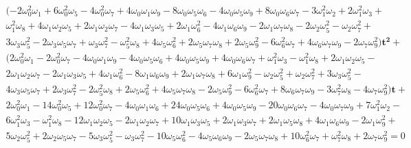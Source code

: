 \documentclass[a4paper,10pt]{amsart}
\theoremstyle{plain}
\theoremstyle{definition}
\theoremstyle{remark}
\numberwithin{equation}{section}
\begin{document}
\begin{gather*}
(-2\omega_{0}^2\omega_{1} + 6\omega_{0}^2\omega_{5} - 4\omega_{0}^2\omega_{7} + 4\omega_{0}\omega_{1}\omega_{9} - 8\omega_{0}\omega_{5}\omega_{6}
    - 4\omega_{0}\omega_{5}\omega_{9} + 8\omega_{0}\omega_{6}\omega_{7} - 3\omega_{1}^2\omega_{2} + 2\omega_{1}^2\omega_{3} +\\
    \omega_{1}^2\omega_{8} + 
4\omega_{1}\omega_{2}\omega_{5} + 2\omega_{1}\omega_{2}\omega_{7} - 4\omega_{1}\omega_{3}\omega_{5} +
    2\omega_{1}\omega_{6}^2 - 4\omega_{1}\omega_{6}\omega_{9} - 2\omega_{1}\omega_{7}\omega_{8} - 2\omega_{2}\omega_{5}^2 -
    \omega_{2}\omega_{7}^2 +\\ 3\omega_{3}\omega_{5}^2 - 2\omega_{3}\omega_{5}\omega_{7} + 
\omega_{3}\omega_{7}^2 - \omega_{5}^2\omega_{8} +
    4\omega_{5}\omega_{6}^2 + 2\omega_{5}\omega_{7}\omega_{8} + 2\omega_{5}\omega_{9}^2 - 6\omega_{6}^2\omega_{7} +
    4\omega_{6}\omega_{7}\omega_{9} - 2\omega_{7}\omega_{9}^2)\pmb{t^2} +\\ (2\omega_{0}^2\omega_{1} - 2\omega_{0}^2\omega_{7} - 4\omega_{0}\omega_{1}\omega_{9} -
    4\omega_{0}\omega_{5}\omega_{6} + 4\omega_{0}\omega_{5}\omega_{9} + 4\omega_{0}\omega_{6}\omega_{7} + \omega_{1}^2\omega_{3} - \omega_{1}^2\omega_{8} +
    2\omega_{1}\omega_{2}\omega_{5} - \\2\omega_{1}\omega_{2}\omega_{7} - 2\omega_{1}\omega_{3}\omega_{5} + 4\omega_{1}\omega_{6}^2 - 8\omega_{1}\omega_{6}\omega_{9} +
    2\omega_{1}\omega_{7}\omega_{8} + 6\omega_{1}\omega_{9}^2 - \omega_{2}\omega_{5}^2 + \omega_{2}\omega_{7}^2 + 3\omega_{3}\omega_{5}^2 -\\
    4\omega_{3}\omega_{5}\omega_{7} + 2\omega_{3}\omega_{7}^2 - 2\omega_{5}^2\omega_{8} + 2\omega_{5}\omega_{6}^2 + 4\omega_{5}\omega_{7}\omega_{8} -
    2\omega_{5}\omega_{9}^2 - 
6\omega_{6}^2\omega_{7} +  8\omega_{6}\omega_{7}\omega_{9} - 3\omega_{7}^2\omega_{8} - 4\omega_{7}\omega_{9}^2)\boldsymbol{t} +\\
    2\omega_{0}^2\omega_{1} - 14\omega_{0}^2\omega_{5} + 12\omega_{0}^2\omega_{7} - 4\omega_{0}\omega_{1}\omega_{6} + 24\omega_{0}\omega_{5}\omega_{6} + 4\omega_{0}\omega_{5}\omega_{9}
    -
 20\omega_{0}\omega_{6}\omega_{7} - 4\omega_{0}\omega_{7}\omega_{9} + 7\omega_{1}^2\omega_{2} -\\ 6\omega_{1}^2\omega_{3} - \omega_{1}^2\omega_{8} - 12\omega_{1}\omega_{2}\omega_{5} -
    2\omega_{1}\omega_{2}\omega_{7} + 10\omega_{1}\omega_{3}\omega_{5} + 2\omega_{1}\omega_{3}\omega_{7} + 2\omega_{1}\omega_{5}\omega_{8} + 
4\omega_{1}\omega_{6}\omega_{9} - 2\omega_{1}\omega_{9}^2
    + \\5\omega_{2}\omega_{5}^2 + 2\omega_{2}\omega_{5}\omega_{7} - 5\omega_{3}\omega_{5}^2 - \omega_{3}\omega_{7}^2 - 10\omega_{5}\omega_{6}^2 - 4\omega_{5}\omega_{6}\omega_{9} -
    2\omega_{5}\omega_{7}\omega_{8} + 10\omega_{6}^2\omega_{7} + \omega_{7}^2\omega_{8} +
 2\omega_{7}\omega_{9}^2=0
 \end{gather*}
\end{document}
